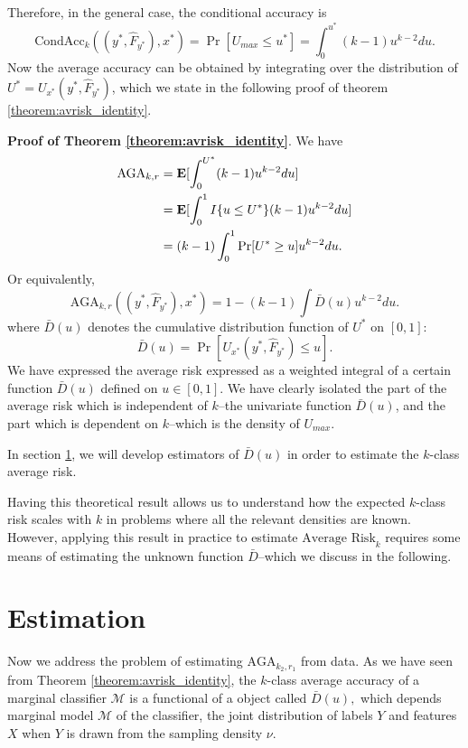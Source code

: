 Therefore, in the general case, the conditional accuracy is
\[
\text{CondAcc}_k((y^*, \hat{F}_{y^*}), x^*) = \Pr[U_{max} \leq u^*] = \int_0^{u^*} (k-1) u^{k-2} du.
\]
Now the average accuracy can be obtained by integrating over the
distribution of $U^* = U_{x^*}(y^*, \hat{F}_{y^*})$, which we state in
the following proof of theorem \ref{theorem:avrisk_identity}.

\noindent\textbf{Proof of Theorem \ref{theorem:avrisk_identity}}.
We have
\begin{align*}
\text{AGA}_{k,r} &= \textbf{E}[\int_0^{U^*} (k-1) u^{k-2} du] 
\\&= \textbf{E}[\int_0^1 I\{u \leq U^*\} (k-1) u^{k-2} du ]
\\&= (k-1) \int_0^1 \Pr[U^* \geq u] u^{k-2} du.
\end{align*}
Or equivalently,
\[
\text{AGA}_{k, r}((y^*, \hat{F}_{y^*}), x^*) = 1 - (k-1) \int \bar{D}(u) u^{k-2} du.
\]
where $\bar{D}(u)$ denotes the cumulative distribution function of $U^*$ on $[0,1]$:
\begin{equation}\label{eq:Kbar}
\bar{D}(u) = \Pr[U_{x^*}(y^*, \hat{F}_{y^*}) \leq u].
\end{equation}
We have expressed the average risk expressed as a weighted integral of
a certain function $\bar{D}(u)$ defined on $u \in [0,1]$.  We have
clearly isolated the part of the average risk which is independent of
$k$--the univariate function $\bar{D}(u)$, and the part which is
dependent on $k$--which is the density of $U_{max}$.

In section \ref{sec:extrapolation_estimation}, we will develop
estimators of $\bar{D}(u)$ in order to estimate the $k$-class average
risk.

Having this theoretical result allows us to understand how the
expected $k$-class risk scales with $k$ in problems where all the
relevant densities are known.  However, applying this result in
practice to estimate $\text{Average Risk}_k$ requires some means of
estimating the unknown function $\bar{D}$--which we discuss in the
following.

\section{Estimation}\label{sec:extrapolation_estimation}

Now we address the problem of estimating $\text{AGA}_{k_2, r_1}$ from
data.  As we have seen from Theorem \ref{theorem:avrisk_identity}, the
$k$-class average accuracy of a marginal classifier $\mathcal{M}$ is a
functional of a object called $\bar{D}(u),$ which depends marginal
model $\mathcal{M}$ of the classifier, the joint distribution of
labels $Y$ and features $X$ when $Y$ is drawn from the sampling
density $\nu$.

